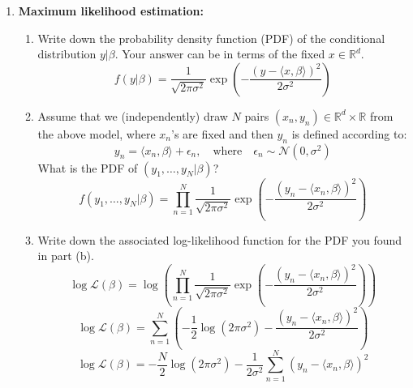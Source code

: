 \documentclass[a3paper,12pt]{extarticle} %
\begin{document}
\begin{enumerate}
    \item \textbf{Maximum likelihood estimation:}
    \begin{enumerate}
        \item Write down the probability density function (PDF) of the conditional distribution \( y | \beta \). Your answer can be in terms of the fixed \( x \in \mathbb{R}^d \).
        \[
            f(y | \beta) = \frac{1}{\sqrt{2 \pi \sigma^2}} \exp \left( -\frac{(y - \langle x, \beta \rangle)^2}{2 \sigma^2} \right)
        \]

        \item Assume that we (independently) draw \( N \) pairs \( (x_n, y_n) \in \mathbb{R}^d \times \mathbb{R} \) from the above model, where \( x_n \)'s are fixed and then \( y_n \) is defined according to:
        \[
            y_n = \langle x_n, \beta \rangle + \epsilon_n, \quad \text{where} \quad \epsilon_n \sim \mathcal{N}(0, \sigma^2)
        \]
        What is the PDF of \( (y_1, \ldots, y_N | \beta) \)?
        \[
            f(y_1, \ldots, y_N | \beta) = \prod_{n=1}^N \frac{1}{\sqrt{2 \pi \sigma^2}} \exp \left( -\frac{(y_n - \langle x_n, \beta \rangle)^2}{2 \sigma^2} \right)
        \]

        \item Write down the associated log-likelihood function for the PDF you found in part (b).
        \[
            \log \mathcal{L}(\beta) = \log \left( \prod_{n=1}^N \frac{1}{\sqrt{2 \pi \sigma^2}} \exp \left( -\frac{(y_n - \langle x_n, \beta \rangle)^2}{2 \sigma^2} \right) \right)
        \]
        \[
            \log \mathcal{L}(\beta) = \sum_{n=1}^N \left( -\frac{1}{2} \log (2 \pi \sigma^2) - \frac{(y_n - \langle x_n, \beta \rangle)^2}{2 \sigma^2} \right)
        \]
        \[
            \log \mathcal{L}(\beta) = -\frac{N}{2} \log (2 \pi \sigma^2) - \frac{1}{2 \sigma^2} \sum_{n=1}^N (y_n - \langle x_n, \beta \rangle)^2
        \]


\end{enumerate}
\end{enumerate}
\end{document}

